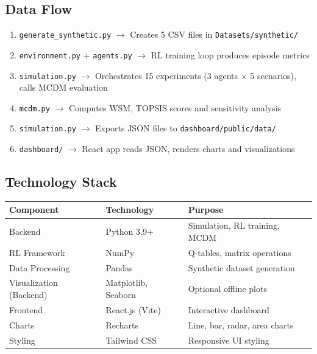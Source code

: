 \documentclass[12pt, a4paper]{article}
\begin{document}
\subsection{Data Flow}

\begin{enumerate}[nosep]
    \item \texttt{generate\_synthetic.py} $\rightarrow$ Creates 5 CSV files in \texttt{Datasets/synthetic/}
    \item \texttt{environment.py} + \texttt{agents.py} $\rightarrow$ RL training loop produces episode metrics
    \item \texttt{simulation.py} $\rightarrow$ Orchestrates 15 experiments (3 agents $\times$ 5 scenarios), calls MCDM evaluation
    \item \texttt{mcdm.py} $\rightarrow$ Computes WSM, TOPSIS scores and sensitivity analysis
    \item \texttt{simulation.py} $\rightarrow$ Exports JSON files to \texttt{dashboard/public/data/}
    \item \texttt{dashboard/} $\rightarrow$ React app reads JSON, renders charts and visualizations
\end{enumerate}

\subsection{Technology Stack}

\begin{longtable}{p{3.5cm}p{3cm}p{5.5cm}}
    \toprule
    \textbf{Component} & \textbf{Technology} & \textbf{Purpose} \\
    \midrule
    Backend & Python 3.9+ & Simulation, RL training, MCDM \\
    RL Framework & NumPy & Q-tables, matrix operations \\
    Data Processing & Pandas & Synthetic dataset generation \\
    Visualization (Backend) & Matplotlib, Seaborn & Optional offline plots \\
    Frontend & React.js (Vite) & Interactive dashboard \\
    Charts & Recharts & Line, bar, radar, area charts \\
    Styling & Tailwind CSS & Responsive UI styling \\
    \bottomrule
\end{longtable}

\end{document}
